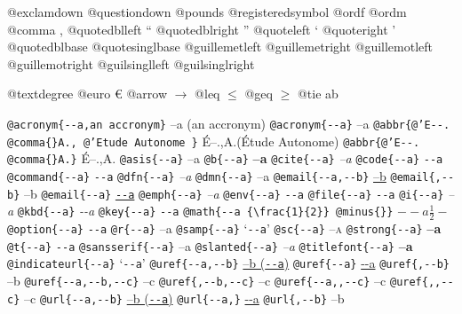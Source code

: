 \documentclass{book}
\begin{document}
@exclamdown \textexclamdown{}
@questiondown \textquestiondown{}
@pounds \textsterling{}
@registeredsymbol \circledR{}
@ordf \textordfeminine{}
@ordm \textordmasculine{}
@comma ,
@quotedblleft \textquotedblleft{}
@quotedblright \textquotedblright{}
@quoteleft \textquoteleft{}
@quoteright \textquoteright{}
@quotedblbase \quotedblbase{}
@quotesinglbase \quotesinglbase{}
@guillemetleft \guillemotleft{}
@guillemetright \guillemotright{}
@guillemotleft \guillemotleft{}
@guillemotright \guillemotright{}
@guilsinglleft \guilsinglleft{}
@guilsinglright \guilsinglright{}

@textdegree \textdegree{}
@euro \euro{}
@arrow $\rightarrow{}$
@leq $\leq{}$
@geq $\geq{}$
@tie a\hbox{}b

\texttt{@acronym\{{-}{-}a,an accronym\}} --a (an accronym)
\texttt{@acronym\{{-}{-}a\}} --a
\texttt{@abbr\{@'E{-}{-}. @comma\{\}A., @'Etude Autonome \}} \'{E}--.\@ ,A.\@ (\'{E}tude Autonome)
\texttt{@abbr\{@'E{-}{-}. @comma\{\}A.\}} \'{E}--.\@ ,A.\@
\texttt{@asis\{{-}{-}a\}} --a
\texttt{@b\{{-}{-}a\}} \textbf{--a}
\texttt{@cite\{{-}{-}a\}} \textsl{--a}
\texttt{@code\{{-}{-}a\}} \texttt{{-}{-}a}
\texttt{@command\{{-}{-}a\}} \texttt{{-}{-}a}
\texttt{@dfn\{{-}{-}a\}} \textsl{--a}
\texttt{@dmn\{{-}{-}a\}} --a
\texttt{@email\{{-}{-}a,{-}{-}b\}} \href{mailto:--a}{--b}
\texttt{@email\{,{-}{-}b\}} --b
\texttt{@email\{{-}{-}a\}} \href{mailto:--a}{\nolinkurl{--a}}
\texttt{@emph\{{-}{-}a\}} \emph{--a}
\texttt{@env\{{-}{-}a\}} \texttt{{-}{-}a}
\texttt{@file\{{-}{-}a\}} \texttt{{-}{-}a}
\texttt{@i\{{-}{-}a\}} \textit{--a}
\texttt{@kbd\{{-}{-}a\}} {\ttfamily\textsl{{-}{-}a}}
\texttt{@key\{{-}{-}a\}} \texttt{{-}{-}a}
\texttt{@math\{{-}{-}a \{\textbackslash{}frac\{1\}\{2\}\} @minus\{\}\}} $--a {\frac{1}{2}} -$
\texttt{@option\{{-}{-}a\}} \texttt{{-}{-}a}
\texttt{@r\{{-}{-}a\}} \textnormal{--a}
\texttt{@samp\{{-}{-}a\}} `\texttt{{-}{-}a}'
\texttt{@sc\{{-}{-}a\}} \textsc{--a}
\texttt{@strong\{{-}{-}a\}} \textbf{--a}
\texttt{@t\{{-}{-}a\}} \texttt{{-}{-}a}
\texttt{@sansserif\{{-}{-}a\}} \textsf{--a}
\texttt{@slanted\{{-}{-}a\}} \textsl{--a}
\texttt{@titlefont\{{-}{-}a\}} {\huge \bfseries --a}
\texttt{@indicateurl\{{-}{-}a\}} `\texttt{{-}{-}a}'
\texttt{@uref\{{-}{-}a,{-}{-}b\}} \href{--a}{--b (\nolinkurl{--a})}
\texttt{@uref\{{-}{-}a\}} \url{--a}
\texttt{@uref\{,{-}{-}b\}} --b
\texttt{@uref\{{-}{-}a,{-}{-}b,{-}{-}c\}} --c
\texttt{@uref\{,{-}{-}b,{-}{-}c\}} --c
\texttt{@uref\{{-}{-}a,,{-}{-}c\}} --c
\texttt{@uref\{,,{-}{-}c\}} --c
\texttt{@url\{{-}{-}a,{-}{-}b\}} \href{--a}{--b (\nolinkurl{--a})}
\texttt{@url\{{-}{-}a,\}} \url{--a}
\texttt{@url\{,{-}{-}b\}} --b
\end{document}
